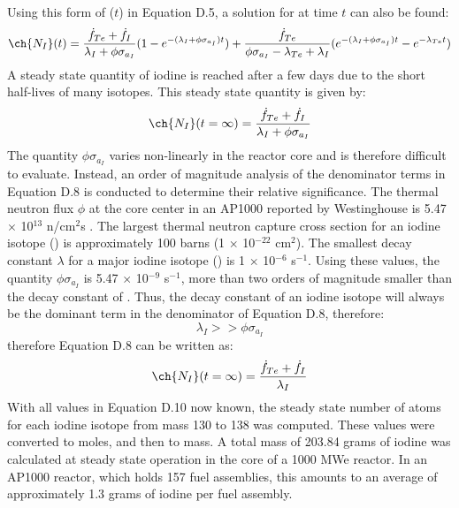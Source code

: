 \documentclass[a4paper,12pt,twoside]{report}
\begin{document}
Using this form of ($t$) in Equation D.5, a solution for  at time $t$ can also be found:
\begin{equation}
\ch{N_{I}}(t) = \frac{\dot{f}_{Te} + \dot{f}_{I}}{\lambda_{I} + \phi\sigma_{a_{I}}}(1 - e^{-(\lambda_{I} + \phi\sigma_{a_{I}})t}) + \frac{\dot{f}_{Te}}{\phi\sigma_{a_{I}} - \lambda_{Te} + \lambda_{I}}(e^{-(\lambda_{I} + \phi\sigma_{a_{I}})t} - e^{-\lambda_{Te}t})
\end{equation}
A steady state quantity of iodine is reached after a few days due to the short half-lives of many isotopes. This steady state quantity is given by:
\begin{equation}
\ch{N_{I}}(t=\infty) = \frac{\dot{f}_{Te} + \dot{f}_{I}}{\lambda_{I} + \phi\sigma_{a_{I}}}
\end{equation}
The quantity $\phi\sigma_{a_{I}}$ varies non-linearly in the reactor core and is therefore difficult to evaluate. Instead, an order of magnitude analysis of the denominator terms in Equation D.8 is conducted to determine their relative significance. The thermal neutron flux $\phi$ at the core center in an AP1000 reported by Westinghouse is 5.47 $\times$ 10$^{13}$ n/cm$^{2}$s \cite{stefani2015neutronic}. The largest thermal neutron capture cross section for an iodine isotope () is approximately 100 barns (1 $\times$ 10$^{-22}$ cm$^{2}$). The smallest decay constant $\lambda$ for a major iodine isotope () is 1 $\times$ 10$^{-6}$ s$^{-1}$. Using these values, the quantity $\phi\sigma_{a_{I}}$ is 5.47 $\times$ 10$^{-9}$ s$^{-1}$, more than two orders of magnitude smaller than the decay constant of . Thus, the decay constant of an iodine isotope will always be the dominant term in the denominator of Equation D.8, therefore:
\begin{equation}
\lambda_{I} >> \phi\sigma_{a_{I}}
\end{equation}
therefore Equation D.8 can be written as:
\begin{equation}
\ch{N_{I}}(t=\infty) = \frac{\dot{f}_{Te} + \dot{f}_{I}}{\lambda_{I}}
\end{equation}
With all values in Equation D.10 now known, the steady state number of atoms for each iodine isotope from mass 130 to 138 was computed. These values were converted to moles, and then to mass. A total mass of 203.84 grams of iodine was calculated at steady state operation in the core of a 1000 MWe reactor. In an AP1000 reactor, which holds 157 fuel assemblies, this amounts to an average of approximately 1.3 grams of iodine per fuel assembly.
\end{document}
